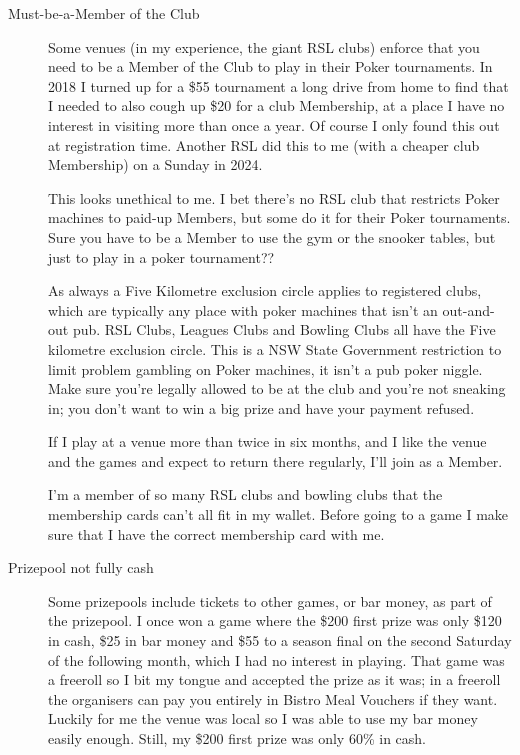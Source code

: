 \begin{description}
\item[Must-be-a-Member of the Club] Some venues (in my experience,
the giant RSL clubs) enforce that you need to be a Member of the Club
to play in their Poker tournaments. In 2018 I turned up for a \$55
tournament a long drive from home to find that I needed to also cough
up \$20 for a club Membership, at a place I have no interest in visiting
more than once a year. Of course I only found this out at registration
time. Another RSL did this to me (with a cheaper club Membership) on a
Sunday in 2024.

This looks unethical to me. I bet there's no RSL club that
restricts Poker machines to paid-up Members, but some do it for
their Poker tournaments. Sure you have to be a Member to use
the gym or the snooker tables, but just to play in a poker
tournament??


As always a Five Kilometre exclusion circle applies to registered
clubs, which are typically any place with poker machines that isn't an
out-and-out pub. RSL Clubs, Leagues Clubs and Bowling Clubs all have
the Five kilometre exclusion circle. This is a NSW State Government
restriction to limit problem gambling on Poker machines, it isn't a
pub poker niggle. Make sure you're legally allowed to be at the club
and you're not sneaking in; you don't want to win a big prize and have
your payment refused.

If I play at a venue more than twice in six months, and I like the
venue and the games and expect to return there regularly, I'll join as
a Member.

I'm a member of so many RSL clubs and bowling clubs that the
membership cards can't all fit in my wallet. Before going to a game I
make sure that I have the correct membership card with me.

\item[Prizepool not fully cash] Some prizepools include tickets
to other games, or bar money, as part of the prizepool. I once won a game
where the \$200 first prize was only \$120 in cash, \$25 in bar money
and \$55 to a season final on the second Saturday of the following month,
which I had no interest in playing. That game was a freeroll so I bit
my tongue and accepted the prize as it was; in a freeroll the organisers
can pay you entirely in Bistro Meal Vouchers if they want. Luckily for
me the venue was local so I was able to use my bar money easily
enough. Still, my \$200 first prize was only 60\% in cash.


\end{description}
